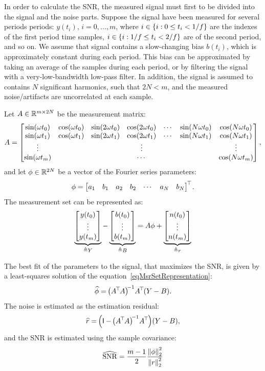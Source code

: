 \documentclass[11pt,letterpaper]{article}
\newcommand{\SNR}{\mathrm{SNR}}
\begin{document}
	In order to calculate the SNR, the measured signal must first to be divided into the signal and the noise parts. Suppose the signal have been measured for several periods periods: $y(t_i)$, $i=0,...,m$, where $i \in {\left\{{i: 0 \leq t_i < 1/f}\right\}}$ are the indexes of the first period time samples, $i \in {\left\{{i: 1/f \leq t_i < 2/f}\right\}}$ are of the second period, and so on.
	We assume that signal contains a slow-changing bias $b(t_i)$, which is approximately constant during each period. This bias can be approximated by taking an average of the samples during each period, or by filtering the signal with a very-low-bandwidth low-pass filter.
	In addition, the signal is assumed to contains $N$ significant harmonics, such that $2N < m$, and the measured noise/artifacts are uncorrelated at each sample.
	
	Let $A\in\mathbb{R}^{m \times 2N}$ be the measurement matrix:
	\begin{equation}
	A = \begin{bmatrix}  \sin(\omega t_0) & \cos(\omega t_0) & \sin(2 \omega t_0) & \cos(2 \omega t_0) & \cdots & \sin(N \omega t_0) & \cos(N \omega t_0) \\
		\sin(\omega t_1) & \cos(\omega t_1) & \sin(2 \omega t_1) & \cos(2 \omega t_1) & \cdots & \sin(N \omega t_1) & \cos(N \omega t_1) \\
		\vdots &  &  & \vdots &  &  & \vdots \\
		\sin(\omega t_m) &  &  & \cdots &  & & \cos(N \omega t_m)
		 \end{bmatrix},
	\end{equation}
	and let $\phi \in \mathbb{R}^{2 N}$ be a vector of the Fourier series parameters:
	\begin{equation}
		\phi = \begin{bmatrix} a_1 & b_1 & a_2 & b_2 & \cdots & a_N & b_N \end{bmatrix}^{{\hspace{-1pt}{\top}\hspace{-1pt}}}.
	\end{equation}
	The measurement set can be represented as:
	\begin{equation}\label{eqMsrSetRepresentation}
	\underbrace{\begin{bmatrix} y(t_0) \\ \vdots \\ y(t_m) \end{bmatrix}}_{\triangleq Y} - \underbrace{\begin{bmatrix} b(t_0) \\ \vdots \\ b(t_m) \end{bmatrix}}_{\triangleq B} = A \phi + \underbrace{\begin{bmatrix} n(t_0) \\ \vdots \\ n(t_m) \end{bmatrix}}_{\triangleq r}
	\end{equation}
	
	The best fit of the parameters to the signal, that maximizes the SNR, is given by a least-squares solution of the equation~\eqref{eqMsrSetRepresentation}:
	\begin{equation}\label{eqLSsolution}
	\widehat{\phi} = {\hspace{-1pt}\left({A^{{\hspace{-1pt}{\top}\hspace{-1pt}}} A}\right)}^{\hspace{-2pt}-1} A^{{\hspace{-1pt}{\top}\hspace{-1pt}}} (Y - B).
	\end{equation}
	The noise is estimated as the estimation residual:
	\begin{equation}\label{key}
	\widehat{r} = {\hspace{-1pt}\left({\mathsf{I} - {\hspace{-1pt}\left({A^{{\hspace{-1pt}{\top}\hspace{-1pt}}} A}\right)}^{\hspace{-2pt}-1} A^{{\hspace{-1pt}{\top}\hspace{-1pt}}}}\right)}(Y - B),
	\end{equation}
	and the SNR is estimated using the sample covariance:
	\begin{equation}\label{key}
	\widehat{\SNR} = \frac{m-1}{2} \frac{\Norm[2]{\phi}^2}{\Norm[2]{r}^2}
	\end{equation}
	
\end{document}

